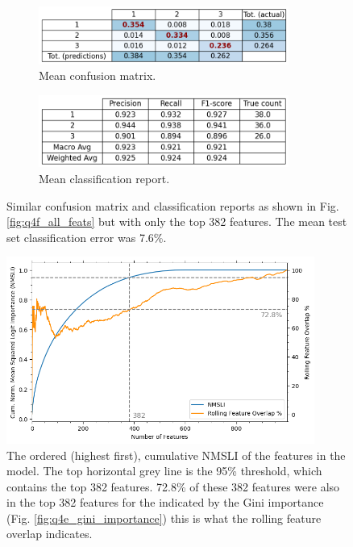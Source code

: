     \begin{figure}[htb]
    \centering
    \begin{subfigure}{0.5\textwidth}
        \centering
        \includegraphics[width=0.9\textwidth]{./figures/q4f_confusion_matrix_reduced_feats}
        \caption{Mean confusion matrix.}
        \label{fig:q4f_confusion_matrix_reduced_feats}
    \end{subfigure}%
    \begin{subfigure}{0.5\textwidth}
        \centering
        \includegraphics[width=0.9\textwidth]{./figures/q4f_classification_report_reduced_feats}
        \caption{Mean classification report.}
        \label{fig:q4f_classification_report_reduced_feats}
    \end{subfigure}
    \caption{Similar confusion matrix and classification reports as shown in Fig. \eqref{fig:q4f_all_feats} but with only
        the top 382 features. The mean test set classification error was 7.6\%.}
    \label{fig:q4f_reduced_feats}
    \end{figure}

    \begin{figure}[htb]
    \centering
    \includegraphics[width=0.9\textwidth]{./figures/q4f_logit_importance}
    \caption{The ordered (highest first), cumulative NMSLI of the features in the  model.
        The top horizontal grey line is the 95\% threshold, which contains the top 382 features. 72.8\% of these 382 features
        were also in the top 382 features for the  indicated by the Gini importance
        (Fig. \eqref{fig:q4e_gini_importance}) this is what the rolling feature overlap indicates.}
        \label{fig:q4f_logit_importance}
    \end{figure}


